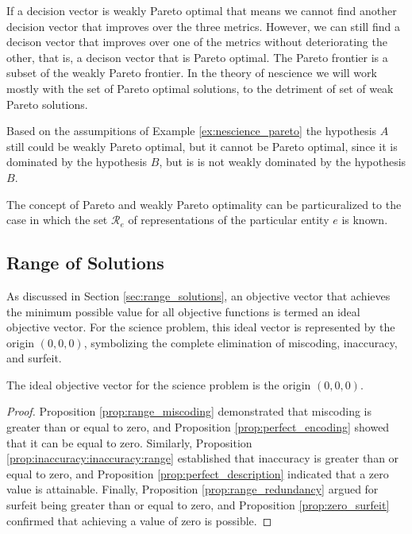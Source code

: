 If a decision vector is weakly Pareto optimal that means we cannot find another decision vector that improves over the three metrics. However, we can still find a decison vector that improves over one of the metrics without deteriorating the other, that is, a decison vector that is Pareto optimal. The Pareto frontier is a subset of the weakly Pareto frontier. In the theory of nescience we will work mostly with the set of Pareto optimal solutions, to the detriment of set of weak Pareto solutions.

\begin{example}
Based on the assumpitions of Example \ref{ex:nescience_pareto} the hypothesis $A$ still could be weakly Pareto optimal, but it cannot be Pareto optimal, since it is dominated by the hypothesis $B$, but is is not weakly dominated by the hypothesis $B$.
\end{example}

The concept of Pareto and weakly Pareto optimality can be particuralized to the case in which the set $\mathcal{R}_e$ of representations of the particular entity $e$ is known.


\subsection*{Range of Solutions}

As discussed in Section \ref{sec:range_solutions}, an objective vector that achieves the minimum possible value for all objective functions is termed an ideal objective vector. For the science problem, this ideal vector is represented by the origin $(0, 0, 0)$, symbolizing the complete elimination of miscoding, inaccuracy, and surfeit.

\begin{proposition}
The ideal objective vector for the science problem is the origin $(0, 0, 0)$.
\end{proposition}
\begin{proof}
Proposition \ref{prop:range_miscoding} demonstrated that miscoding is greater than or equal to zero, and Proposition \ref{prop:perfect_encoding} showed that it can be equal to zero. Similarly, Proposition \ref{prop:inaccuracy:inaccuracy:range} established that inaccuracy is greater than or equal to zero, and Proposition \ref{prop:perfect_description} indicated that a zero value is attainable. Finally, Proposition \ref{prop:range_redundancy} argued for surfeit being greater than or equal to zero, and Proposition \ref{prop:zero_surfeit} confirmed that achieving a value of zero is possible.
\end{proof}

